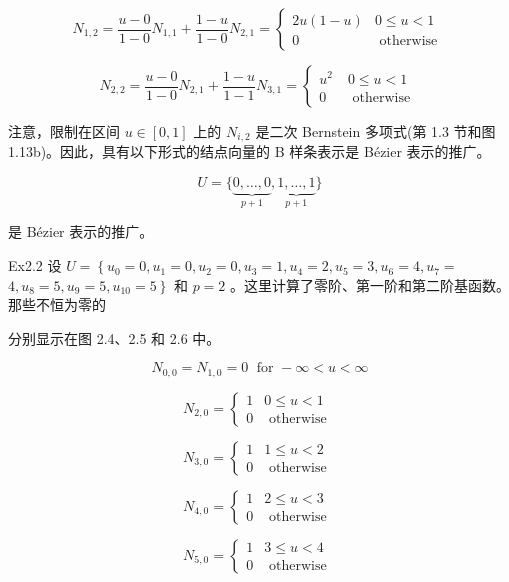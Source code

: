 \documentclass[../main.tex]{subfiles}
\begin{document}
\[
{N}_{1,2} = \frac{u - 0}{1 - 0}{N}_{1,1} + \frac{1 - u}{1 - 0}{N}_{2,1} = \left\{  \begin{matrix} {2u}\left( {1 - u}\right) & 0 \leq  u < 1 \\  0 & \text{ otherwise } \end{matrix}\right.
\]

\[
{N}_{2,2} = \frac{u - 0}{1 - 0}{N}_{2,1} + \frac{1 - u}{1 - 1}{N}_{3,1} = \left\{  \begin{matrix} {u}^{2} & \;0 \leq  u < 1 \\  0 & \;\text{ otherwise } \end{matrix}\right.
\]

注意，限制在区间 \(u \in  \left\lbrack  {0,1}\right\rbrack\) 上的 \({N}_{i,2}\) 是二次 Bernstein 多项式(第 1.3 节和图 1.13b)。因此，具有以下形式的结点向量的 B 样条表示是 Bézier 表示的推广。

\[
U = \{ \underset{p + 1}{\underbrace{0,\ldots ,0}},\underset{p + 1}{\underbrace{1,\ldots ,1}}\}
\]

是 Bézier 表示的推广。

Ex2.2 设 \(U = \left\{  {{u}_{0} = 0,{u}_{1} = 0,{u}_{2} = 0,{u}_{3} = 1,{u}_{4} = 2,{u}_{5} = 3,{u}_{6} = 4,{u}_{7} = }\right.\)  \(\left. {4,{u}_{8} = 5,{u}_{9} = 5,{u}_{10} = 5}\right\}\) 和 \(p = 2\) 。这里计算了零阶、第一阶和第二阶基函数。那些不恒为零的

分别显示在图 2.4、2.5 和 2.6 中。

\[
{N}_{0,0} = {N}_{1,0} = 0\;\text{ for } - \infty  < u < \infty
\]

\[
{N}_{2,0} = \left\{  \begin{array}{ll} 1 & 0 \leq  u < 1 \\  0 & \text{ otherwise } \end{array}\right.
\]

\[
{N}_{3,0} = \left\{  \begin{array}{ll} 1 & 1 \leq  u < 2 \\  0 & \text{ otherwise } \end{array}\right.
\]

\[
{N}_{4,0} = \left\{  \begin{array}{ll} 1 & 2 \leq  u < 3 \\  0 & \text{ otherwise } \end{array}\right.
\]

\[
{N}_{5,0} = \left\{  \begin{array}{ll} 1 & 3 \leq  u < 4 \\  0 & \text{ otherwise } \end{array}\right.
\]
\end{document}
